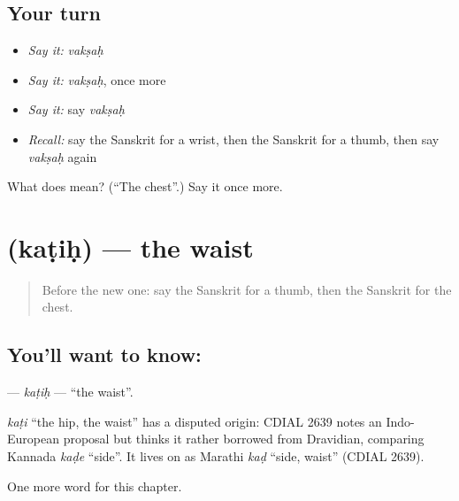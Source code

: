 \subsection*{Your turn}
\begin{itemize}
\raggedright
  \item \emph{Say it:} \emph{vakṣaḥ}
  \item \emph{Say it:} \emph{vakṣaḥ}, once more
  \item \emph{Say it:} say \emph{vakṣaḥ}
  \item \emph{Recall:} say the Sanskrit for a wrist, then the Sanskrit for a thumb, then say \emph{vakṣaḥ} again
\end{itemize}

\begin{tcolorbox}[breakable,colback=teal!4,colframe=teal!35!black,title={Before you move on}]
What does  mean? (\textquotedblleft{}The chest\textquotedblright{}.) Say it once more.
\end{tcolorbox}
\section[\texorpdfstring{\sk{कटिः} (kaṭiḥ)}{कटिः (kaṭiḥ)}]{ (kaṭiḥ) — the waist}

\label{lesson:SA-C117-katih}



\begin{quote}
Before the new one: say the Sanskrit for a thumb, then the Sanskrit for the chest.
\end{quote}

\subsection*{You'll want to know: }
\textbf{} — \emph{kaṭiḥ} — \textquotedblleft{}the waist\textquotedblright{}.

\begin{cousinweb}
\emph{kaṭi} \textquotedblleft{}the hip, the waist\textquotedblright{} has a disputed origin: CDIAL 2639 notes an Indo-European proposal but thinks it rather borrowed from Dravidian, comparing Kannada \emph{kaḍe} \textquotedblleft{}side\textquotedblright{}. It lives on as Marathi \emph{kaḍ} \textquotedblleft{}side, waist\textquotedblright{} (CDIAL 2639).
\end{cousinweb}

\begin{grammarlens}[title={What you've built}]
One more word for this chapter.
\end{grammarlens}

